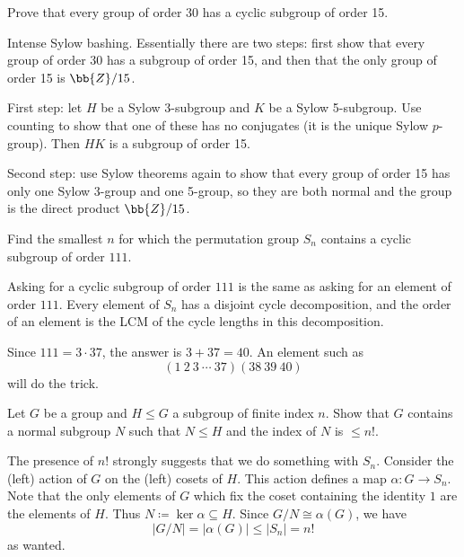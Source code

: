 \begin{problem}
	Prove that every group of order 30 has a cyclic subgroup of order 15.
\end{problem}
\begin{solution}
	Intense Sylow bashing. Essentially there are two steps: first show that every group of order 30 has a subgroup of order 15, and then that the only group of order 15 is $\bb{Z}/15$.
	
	First step: let $H$ be a Sylow 3-subgroup and $K$ be a Sylow 5-subgroup. Use counting to show that one of these has no conjugates (it is the unique Sylow $p$-group). Then $HK$ is a subgroup of order 15.
	
	Second step: use Sylow theorems again to show that every group of order 15 has only one Sylow 3-group and one 5-group, so they are both normal and the group is the direct product $\bb{Z}/15$.
\end{solution}

\begin{problem}
	Find the smallest $n$ for which the permutation group $S_n$ contains a cyclic subgroup of order $111$.
\end{problem}
\begin{solution}
	Asking for a cyclic subgroup of order $111$ is the same as asking for an element of order $111$. Every element of $S_n$ has a disjoint cycle decomposition, and the order of an element is the LCM of the cycle lengths in this decomposition.
	
	Since $111 = 3 \cdot 37$, the answer is $3+37 = 40$. An element such as
	\[
		(1 \: 2 \: 3 \: \cdots \: 37)(38 \: 39 \: 40)
	\]
	will do the trick.
\end{solution}

\begin{problem}
	Let $G$ be a group and $H \leq G$ a subgroup of finite index $n$. Show that $G$ contains a normal subgroup $N$ such that $N \leq H$ and the index of $N$ is $\leq n!$.
\end{problem}
\begin{solution}
	The presence of $n!$ strongly suggests that we do something with $S_n$. Consider the (left) action of $G$ on the (left) cosets of $H$. This action defines a map $\alpha \colon G \to S_n$. Note that the only elements of $G$ which fix the coset containing the identity $1$ are the elements of $H$. Thus $N\coloneqq \ker \alpha \subseteq H$. Since $G/N \cong \alpha(G)$, we have
	\[
		|G/N| = |\alpha(G)| \leq |S_n| = n!
	\]
	as wanted.
\end{solution}


